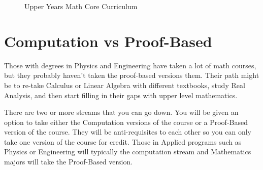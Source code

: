 \documentclass[openany,10pt]{book}
\begin{document}
\begin{figure}[H]
	\caption{Upper Years Math Core Curriculum} \label{fig:M2}
\end{figure}

\section*{Computation vs Proof-Based}

Those with degrees in Physics and Engineering have taken a lot of math courses, but they probably haven't taken the proof-based versions them.  Their path might be to re-take Calculus or Linear Algebra with different textbooks, study Real Analysis, and then start filling in their gaps with upper level mathematics.\newline

There are two or more streams that you can go down.  You will be given an option to take either the Computation versions of the course or a Proof-Based version of the course.  They will be anti-requisites to each other so you can only take one version of the course for credit.  Those in Applied programs such as Physics or Engineering will typically the computation stream and Mathematics majors will take the Proof-Based version.
\end{document}
